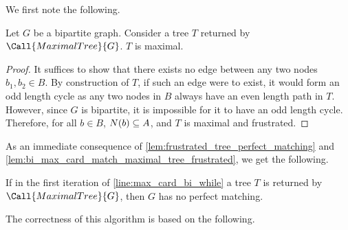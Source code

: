 We first note the following. 
\begin{lemma}
    Let $G$ be a bipartite graph. Consider a tree $T$ returned by $\Call{MaximalTree}{G}$. $T$ is maximal. 
    \label{lem:bi_max_card_match_maximal_tree_frustrated}
\end{lemma}
\begin{proof}
    It suffices to show that there exists no edge between any two nodes $b_1, b_2 \in B$. By construction of $T$, if such 
    an edge were to exist, it would form an odd length cycle as any two nodes in $B$ always have an even length path in $T$. 
    However, since $G$ is bipartite, it is impossible for it to have an odd length cycle. Therefore, for all $b \in B$, $\f[N]{b} \sse A$, 
    and $T$ is maximal and frustrated. 
\end{proof}

As an immediate consequence of \cref{lem:frustrated_tree_perfect_matching} and \cref{lem:bi_max_card_match_maximal_tree_frustrated}, 
we get the following. 

\begin{corollary}
    If in the first iteration of \cref{line:max_card_bi_while} a tree $T$ is returned by $\Call{MaximalTree}{G}$, 
    then $G$ has no perfect matching. 
    \label{cor:maximal_tree_bi_no_perf}
\end{corollary}

The correctness of this algorithm is based on the following. 

